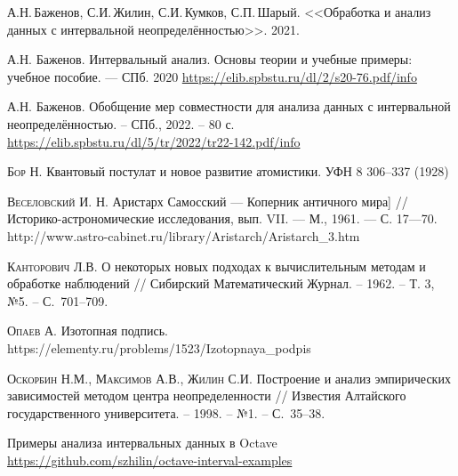 \documentclass[a5paper,openany]{book}
\begin{document}
	
\begin{thebibliography}{00}


	 А.Н.\,Баженов, С.И.\,Жилин, С.И.\,Кумков, С.П.\,Шарый. <<Обработка и анализ данных с интервальной неопределённостью>>. 2021.

	А.Н. Баженов. Интервальный анализ. Основы теории и учебные примеры: учебное пособие. --- СПб. 2020
	\url{https://elib.spbstu.ru/dl/2/s20-76.pdf/info}
	
	А.Н. Баженов. Обобщение мер совместности для анализа данных с интервальной неопределённостью. – СПб., 2022. – 80 с.
	\url{https://elib.spbstu.ru/dl/5/tr/2022/tr22-142.pdf/info}

	\textsc{Бор Н.} Квантовый постулат и новое развитие атомистики. УФН 8 306–337 (1928)
	
	 \textsc{Веселовский И. Н.}
Аристарх Самосский — Коперник античного мира] // Историко-астрономические исследования, вып. VII. — М., 1961. — С. 17—70. \\
http://www.astro-cabinet.ru/library/Aristarch/Aristarch\_3.htm 
	
	
	
	\textsc{Канторович Л.В.} О некоторых новых подходах к вычислительным методам и обработке 
	наблюдений // Сибирский Математический Журнал. -- 1962. -- Т. 3, №5. -- С.~701--709. 
	
	
	\textsc{Опаев А.} Изотопная подпись. \\	
	https://elementy.ru/problems/1523/Izotopnaya\_podpis
	
	
	\textsc{Оскорбин Н.М., Максимов А.В., Жилин С.И.} 
	Построение и анализ эмпирических зависимостей методом центра неопределенности // 
	Известия Алтайского государственного университета. -- 1998. -- №1. -- С.~35--38. 
	
	Примеры анализа интервальных данных в Octave \\ 
	\url{https://github.com/szhilin/octave-interval-examples}
	


\end{thebibliography}
\end{document}
